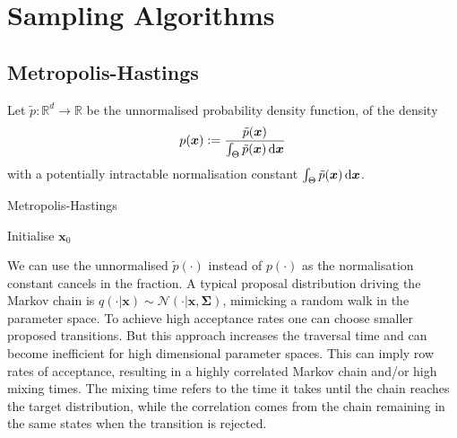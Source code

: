 

\section{Sampling Algorithms}


\subsection{Metropolis-Hastings}

Let $\tilde{p}: \mathbb{R}^d \to \mathbb{R}$ be the unnormalised probability density function, of the density
\[
	p(\bm{x}) := \frac{ \tilde{p}(\bm{x}) }{ \int_{\Theta} \tilde{p}(\bm{x}) \mathop{}\!\mathrm{d} \bm{x} }
\]
with a potentially intractable normalisation constant $\int_{\Theta} \tilde{p}(\bm{x}) \mathop{}\!\mathrm{d} \bm{x}$.

\NoCaptionOfAlgo
\begin{algorithm}[H]
\SetAlgoLined
\DontPrintSemicolon
{}
\SetAlCapSkip{1em}
\SetAlCapNameFnt{\normalfont\normalsize}
\caption{Metropolis-Hastings}

Initialise $\bm{x}_0$ \;

\end{algorithm}

We can use the unnormalised $\tilde{p}( \cdot )$ instead of $p( \cdot )$ as the normalisation constant cancels in the fraction.
A typical proposal distribution driving the Markov chain is $q(\cdot | \bm{x}) \sim \mathcal{N}( \cdot | \bm{x}, \bm{\Sigma})$, 
mimicking a random walk in the parameter space.
To achieve high acceptance rates one can choose smaller proposed transitions.
But this approach increases the traversal time and can become inefficient for high dimensional parameter spaces.
This can imply row rates of acceptance, resulting in a highly correlated Markov chain and/or high mixing times.
The mixing time refers to the time it takes until the chain reaches the target distribution, 
while the correlation comes from the chain remaining in the same states when the transition is rejected.
























